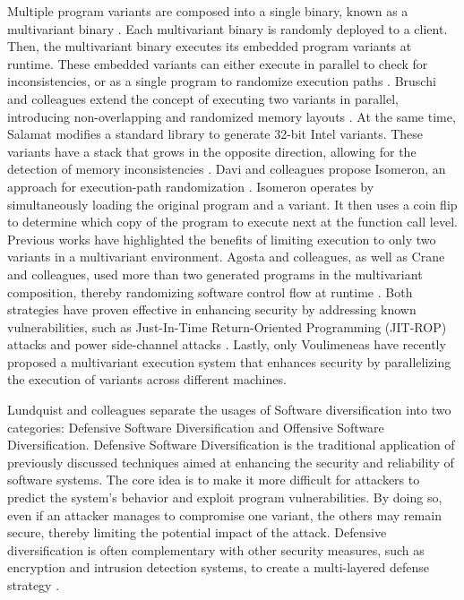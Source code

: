 Multiple program variants are composed into a single binary, known as a multivariant binary \cite{cox06}. 
Each multivariant binary is randomly deployed to a client.
Then, the multivariant binary executes its embedded program variants at runtime. 
These embedded variants can either execute in parallel to check for inconsistencies, or as a single program to randomize execution paths \cite{bhatkar03}. 
Bruschi and colleagues extend the concept of executing two variants in parallel, introducing non-overlapping and randomized memory layouts \cite{bruschi2007diversified}. 
At the same time, Salamat \etal modifies a standard library to generate 32-bit Intel variants. 
These variants have a stack that grows in the opposite direction, allowing for the detection of memory inconsistencies \cite{salamat2007stopping}. 
Davi and colleagues propose Isomeron, an approach for execution-path randomization \cite{davi2015isomeron}. 
Isomeron operates by simultaneously loading the original program and a variant. 
It then uses a coin flip to determine which copy of the program to execute next at the function call level. 
Previous works have highlighted the benefits of limiting execution to only two variants in a multivariant environment. 
Agosta and colleagues, as well as Crane and colleagues, used more than two generated programs in the multivariant composition, thereby randomizing software control flow at runtime \cite{agosta2015meet, crane2015thwarting}. 
Both strategies have proven effective in enhancing security by addressing known vulnerabilities, such as Just-In-Time Return-Oriented Programming (JIT-ROP) attacks \cite{jackson2011compiler} and power side-channel attacks \cite{amarilli2011can}. 
Lastly, only Voulimeneas \etal \cite{voulimeneas2021dmvx} have recently proposed a multivariant execution system that enhances security by parallelizing the execution of variants across different machines.


Lundquist and colleagues \cite{offensive_div} separate the usages of Software diversification into two categories: Defensive Software Diversification and Offensive Software Diversification.
Defensive Software Diversification is the traditional application of previously discussed techniques aimed at enhancing the security and reliability of software systems.
The core idea is to make it more difficult for attackers to predict the system's behavior and exploit program vulnerabilities. 
By doing so, even if an attacker manages to compromise one variant, the others may remain secure, thereby limiting the potential impact of the attack.
Defensive diversification is often complementary with other security measures, such as encryption and intrusion detection systems, to create a multi-layered defense strategy \cite{cryptography4020013}. 

